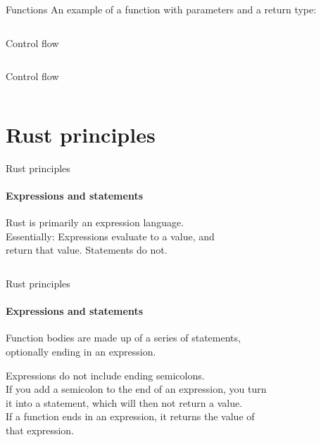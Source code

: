 \documentclass[usenames,dvipsnames,10pt,aspectratio=169]{beamer}
\begin{document}
\begin{frame}{Functions}
\large
An example of a function with parameters and a return type:
\vspace{0.2cm}
\inputminted[fontsize=\large]{rust}{code/function.rs}
\vspace{0.5cm}
\end{frame}

\begin{frame}{Control flow}
\inputminted[fontsize=\Large]{rust}{code/control1.rs}
\vspace{0.7cm}
\end{frame}

\begin{frame}{Control flow}
\inputminted[fontsize=\Large]{rust}{code/control2.rs}
\vspace{0.7cm}
\end{frame}


\section{Rust principles}
\begin{frame}{Rust principles}
\framesubtitle{Expressions and statements}
\large{\textcolor{ucuyellow}{Rust is primarily an expression language.\\}}
\vspace{0.5cm}
\normalsize
Essentially: Expressions evaluate to a value, and\\
return that value. Statements do not.
\vspace{0.5cm}
\inputminted[fontsize=\large]{rust}{code/expression1.rs}
\end{frame}

\begin{frame}{Rust principles}
\framesubtitle{Expressions and statements}
\normalsize
Function bodies are made up of a series of statements, \\
optionally ending in an expression.

\vspace{0.4cm}
Expressions do not include ending semicolons.\\

\vspace{0.4cm}
If you add a semicolon to the end of an expression, you turn \\
it into a statement, which will then not return a value.\\
If a function ends in an expression, it returns the value of\\
that expression.
\vspace{0.5cm}
\inputminted[fontsize=\large]{rust}{code/expression2.rs}
\vspace{0.5cm}
\end{frame}
\end{document}
